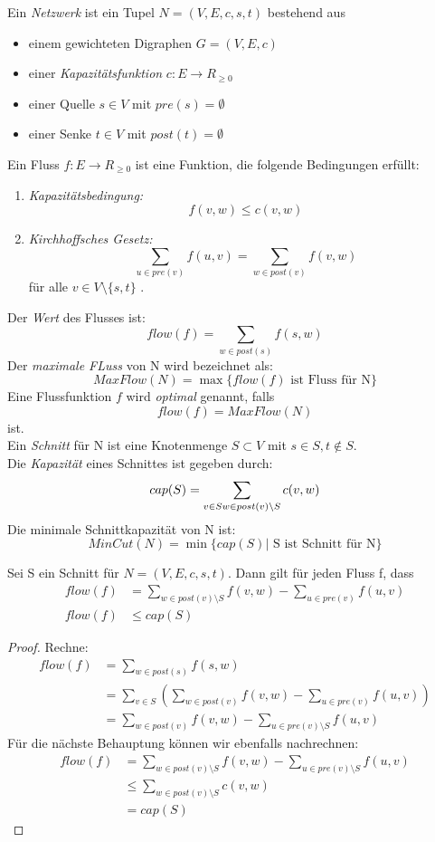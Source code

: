 \begin{definition}
Ein \emph{Netzwerk} ist ein Tupel $N=(V,E,c,s,t)$  bestehend aus
\begin{itemize}
	\item einem gewichteten Digraphen $G=(V,E,c)$
	\item einer \emph{Kapazitätsfunktion} $c \colon E \to R_{\ge 0}$
	\item einer Quelle $s \in V$ mit $pre(s)= \emptyset$ 
	\item einer Senke $t \in V$ mit $post(t)=\emptyset$ 
\end{itemize}
Ein Fluss $f \colon E \to R_{\ge 0}$ ist eine Funktion, die folgende Bedingungen erfüllt:
\begin{enumerate}
	\item \emph{Kapazitätsbedingung:}
		\[
		f(v,w) \le c(v,w)
		\]
	\item \emph{Kirchhoffsches Gesetz:}
		\[
		\sum_{u \in pre(v)} f(u,v) = \sum_{w \in  post(v)} f(v,w)
		\]
für alle $v \in V \setminus \{s,t\} $ .
\end{enumerate}
Der \emph{Wert} des Flusses ist:
\[
flow(f) = \sum_{w \in post(s)}f(s,w)
\]
Der \emph{maximale FLuss} von N wird bezeichnet als:
\[
MaxFlow(N) = \max \{flow(f) \text{ ist Fluss für N}\} 
\]
Eine Flussfunktion $f$ wird \emph{optimal} genannt, falls 
\[
flow(f)=MaxFlow(N)
\]
ist. \\
Ein \emph{Schnitt} für N ist eine Knotenmenge $S \subset V$ mit $s \in S, t \not\in S$. \\
Die \emph{Kapazität} eines Schnittes ist gegeben durch:
\[
cap(S)= \sum_{v \in S \\ w \in post(v) \setminus S}c(v,w)
\]
Die minimale Schnittkapazität von N ist:
\[
MinCut(N)= \min \{cap(S) | \text{ S ist Schnitt für N}\} 
\]
\end{definition}
\begin{lemma}
	Sei S ein Schnitt für $N=(V,E,c,s,t)$. Dann gilt für jeden Fluss f, dass
	\begin{align*}
		flow(f) &= \sum_{w \in post(v) \setminus S} f(v,w) - \sum_{u \in  pre(v)} f(u,v) \\
		flow(f) &\le cap(S)
	\end{align*}
\end{lemma}
\begin{proof}
Rechne:
\begin{align*}
	flow(f) &= \sum_{w \in post(s)} f(s,w) \\
		&= \sum_{v \in S}\left( \sum_{w \in post(v)}f(v,w)- \sum_{u \in pre(v)}f(u,v) \right)\\
		&=\sum_{w \in post(v)}f(v,w) - \sum_{u \in pre(v) \setminus S}f(u,v)
\end{align*}
Für die nächste Behauptung können wir ebenfalls nachrechnen:
\begin{align*}
	flow(f) &= \sum_{w \in post(v) \setminus S} f(v,w) - \sum_{u \in pre(v) \setminus S}f(u,v) \\
		&\le \sum_{w \in post(v) \setminus S}c(v,w) \\
		&=cap(S)
\end{align*}
\end{proof}
